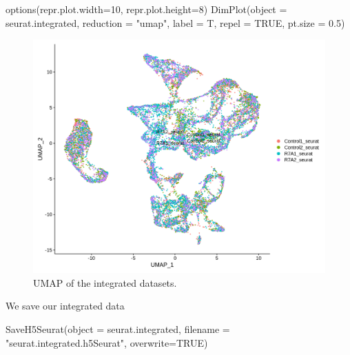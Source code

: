 \documentclass[
  letterpaper,
  DIV=11,
  numbers=noendperiod]{scrartcl}
\newenvironment{Shaded}{\begin{snugshade}}{\end{snugshade}}
\newcommand{\AttributeTok}[1]{\textcolor[rgb]{0.49,0.56,0.16}{#1}}
\newcommand{\ConstantTok}[1]{\textcolor[rgb]{0.53,0.00,0.00}{#1}}
\newcommand{\DecValTok}[1]{\textcolor[rgb]{0.25,0.63,0.44}{#1}}
\newcommand{\FloatTok}[1]{\textcolor[rgb]{0.25,0.63,0.44}{#1}}
\newcommand{\FunctionTok}[1]{\textcolor[rgb]{0.02,0.16,0.49}{#1}}
\newcommand{\NormalTok}[1]{\textcolor[rgb]{0.00,0.44,0.13}{#1}}
\newcommand{\StringTok}[1]{\textcolor[rgb]{0.25,0.44,0.63}{#1}}
\begin{document}
\begin{Shaded}
\begin{Highlighting}[]
\FunctionTok{options}\NormalTok{(}\AttributeTok{repr.plot.width=}\DecValTok{10}\NormalTok{, }\AttributeTok{repr.plot.height=}\DecValTok{8}\NormalTok{)}
\FunctionTok{DimPlot}\NormalTok{(}\AttributeTok{object =}\NormalTok{ seurat.integrated, }\AttributeTok{reduction =} \StringTok{"umap"}\NormalTok{,  }\AttributeTok{label =}\NormalTok{ T, }\AttributeTok{repel =} \ConstantTok{TRUE}\NormalTok{, }\AttributeTok{pt.size =} \FloatTok{0.5}\NormalTok{)}
\end{Highlighting}
\end{Shaded}

\begin{figure}[H]

{\centering \includegraphics{notebook_files/figure-pdf/fig-umapint-output-1.png}

}

\caption{\label{fig-umapint}UMAP of the integrated datasets.}

\end{figure}

We save our integrated data

\begin{Shaded}
\begin{Highlighting}[]
\FunctionTok{SaveH5Seurat}\NormalTok{(}\AttributeTok{object =}\NormalTok{ seurat.integrated, }\AttributeTok{filename =} \StringTok{"seurat.integrated.h5Seurat"}\NormalTok{, }\AttributeTok{overwrite=}\ConstantTok{TRUE}\NormalTok{)}
\end{Highlighting}
\end{Shaded}
\end{document}
